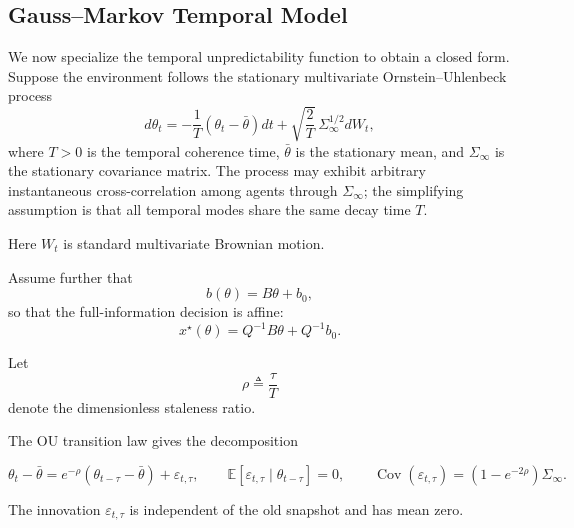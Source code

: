 \documentclass[11pt]{article}
\begin{document}
\subsection{Gauss--Markov Temporal Model}
\label{subsec:OU_model}

We now specialize the temporal unpredictability function to obtain a closed
form. Suppose the environment follows the stationary multivariate
Ornstein--Uhlenbeck process
\begin{equation}
    d\theta_t
    =
    -\frac{1}{T}
    \left(
        \theta_t-\bar{\theta}
    \right)dt
    +
    \sqrt{\frac{2}{T}}\,
    \Sigma_\infty^{1/2}dW_t,
    \label{eq:OU_process}
\end{equation}
where $T>0$ is the temporal coherence time,
$\bar{\theta}$ is the stationary mean, and $\Sigma_\infty$ is the stationary
covariance matrix. The process may exhibit arbitrary instantaneous
cross-correlation among agents through $\Sigma_\infty$; the simplifying
assumption is that all temporal modes share the same decay time $T$.

Here $W_t$ is standard multivariate Brownian motion.

Assume further that
\begin{equation}
    b(\theta)=B\theta+b_0,
    \label{eq:affine_b}
\end{equation}
so that the full-information decision is affine:
\begin{equation}
    x^\star(\theta)
    =
    Q^{-1}B\theta+Q^{-1}b_0.
    \label{eq:affine_xstar}
\end{equation}

Let
\begin{equation}
    \rho
    \triangleq
    \frac{\tau}{T}
    \label{eq:rho_definition}
\end{equation}
denote the dimensionless staleness ratio.

The OU transition law \cite[eqs.~(8)--(10), (14)]{ornee2021ou} gives the decomposition

\begin{equation}
\theta_t-\bar\theta=e^{-\rho}(\theta_{t-\tau}-\bar\theta)+\varepsilon_{t,\tau},\qquad \mathbb E[\varepsilon_{t,\tau}\mid\theta_{t-\tau}]=0,\qquad \operatorname{Cov}(\varepsilon_{t,\tau})=(1-e^{-2\rho})\Sigma_\infty.
\label{eq:state_innovation_decomposition}
\end{equation}

The innovation $\varepsilon_{t,\tau}$ is independent of the old snapshot and
has mean zero.
\end{document}
